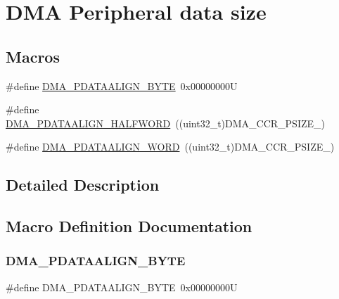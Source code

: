 \hypertarget{group___d_m_a___peripheral__data__size}{}\section{D\+MA Peripheral data size}
\label{group___d_m_a___peripheral__data__size}
\subsection*{Macros}
\begin{DoxyCompactItemize}
\item 
\#define \hyperlink{group___d_m_a___peripheral__data__size_ga55b8c8f5ec95f10d26d6c5b1c9136730}{D\+M\+A\+\_\+\+P\+D\+A\+T\+A\+A\+L\+I\+G\+N\+\_\+\+B\+Y\+TE}~0x00000000U
\item 
\#define \hyperlink{group___d_m_a___peripheral__data__size_gac08bfd907442dba5358830b247135bcc}{D\+M\+A\+\_\+\+P\+D\+A\+T\+A\+A\+L\+I\+G\+N\+\_\+\+H\+A\+L\+F\+W\+O\+RD}~((uint32\+\_\+t)D\+M\+A\+\_\+\+C\+C\+R\+\_\+\+P\+S\+I\+Z\+E\+\_)
\item 
\#define \hyperlink{group___d_m_a___peripheral__data__size_gaad50e97cbc4a726660db9c3f42ac93b0}{D\+M\+A\+\_\+\+P\+D\+A\+T\+A\+A\+L\+I\+G\+N\+\_\+\+W\+O\+RD}~((uint32\+\_\+t)D\+M\+A\+\_\+\+C\+C\+R\+\_\+\+P\+S\+I\+Z\+E\+\_)
\end{DoxyCompactItemize}


\subsection{Detailed Description}


\subsection{Macro Definition Documentation}
\mbox{\label{group___d_m_a___peripheral__data__size_ga55b8c8f5ec95f10d26d6c5b1c9136730}} 
\subsubsection{\texorpdfstring{D\+M\+A\+\_\+\+P\+D\+A\+T\+A\+A\+L\+I\+G\+N\+\_\+\+B\+Y\+TE}{DMA\_PDATAALIGN\_BYTE}}
{\footnotesize\ttfamily \#define D\+M\+A\+\_\+\+P\+D\+A\+T\+A\+A\+L\+I\+G\+N\+\_\+\+B\+Y\+TE~0x00000000U}

